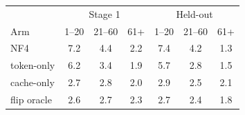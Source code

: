 \begin{tabular}{lcccccc}
\toprule
 & \multicolumn{3}{c}{Stage 1} & \multicolumn{3}{c}{Held-out} \\
Arm & 1--20 & 21--60 & 61+ & 1--20 & 21--60 & 61+ \\
\midrule
NF4 & 7.2 & 4.4 & 2.2 & 7.4 & 4.2 & 1.3 \\
token-only & 6.2 & 3.4 & 1.9 & 5.7 & 2.8 & 1.5 \\
cache-only & 2.7 & 2.8 & 2.0 & 2.9 & 2.5 & 2.1 \\
flip oracle & 2.6 & 2.7 & 2.3 & 2.7 & 2.4 & 1.8 \\
\bottomrule
\end{tabular}
